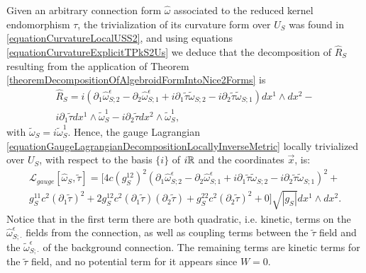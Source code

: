 Given an arbitrary connection form $\hat \omega$ associated to the reduced kernel endomorphism $\tau$, the trivialization of its curvature form over $U_S$ was found in \eqref{equationCurvatureLocalUSS2}, 
and using equations \eqref{equationCurvatureExplicitTPkS2Us} we deduce that the decomposition of $\hat R_S$ resulting from the application of Theorem \ref{theoremDecompositionOfAlgebroidFormIntoNice2Forms} is
\begin{multline}
    \hat R_S = i(\partial_{1} \hat \omega^\epsilon_{S;2} - \partial_{2} \hat \omega^\epsilon_{S; 1} + i \partial_1 \tilde \tau \tilde \omega_{S; 2} - i \partial_2 \tilde \tau \tilde \omega_{S; 1}) dx^1 \wedge dx^2 
    - \\i \partial_{1} \tilde \tau dx^1 \wedge \tilde \omega_S^1 
    -  i \partial_{2} \tilde \tau dx^2 \wedge \tilde \omega_S^1,
\end{multline}
with $\tilde \omega_S = i\tilde \omega_S^1$.
Hence, the gauge Lagrangian \eqref{equationGaugeLagrangianDecompositionLocallyInverseMetric} locally trivialized over $U_S$, with respect to the basis $\{i\}$ of $i\mathbb{R}$ and the coordinates $\vec x$, is:
\begin{multline}
    \mathcal L_{gauge}[\hat \omega_S, \tilde \tau] = [4c (g_S^{12})^2 (\partial_{1} \hat \omega^\epsilon_{S;2} - \partial_{2} \hat \omega^\epsilon_{S;1} + i \partial_1 \tilde \tau \tilde \omega_{S; 2} - i \partial_2 \tilde \tau \tilde \omega_{S; 1})^2 + \\ 
        g_S^{11} c^2 (\partial_1 \tilde \tau)^2 + 2g_S^{12} c^2 (\partial_1 \tilde \tau)(\partial_2 \tilde \tau) + g_S^{22} c^2 (\partial_2 \tilde \tau)^2
        +0] \sqrt{|g_S|}dx^1 \wedge dx^2.
\end{multline}
Notice that in the first term there are both quadratic, i.e. kinetic, terms on the $\hat \omega_{S;\cdot}^\epsilon$ fields from the connection, as well as coupling terms between the $\tilde \tau$ field and the $\tilde \omega_{S;\cdot}^\epsilon$ of the background connection. The remaining terms are kinetic terms for the $\tilde \tau$ field, and no potential term for it appears since $W = 0$.

